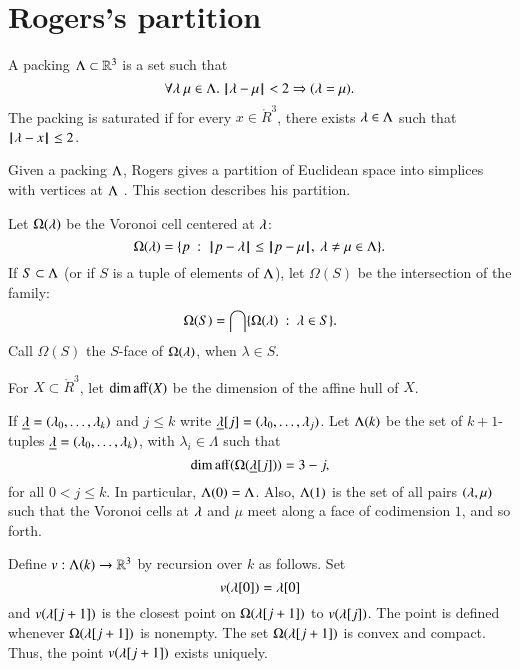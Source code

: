 \section{Rogers's partition}\label{sec:rogers}

\begin{definition}
A packing $\Lambda\subset \mathbb{R}^3$ is a set such that
$$\forall \lambda~\mu\in \Lambda.~  {\hskip0.1em|\hskip-0.15em|\hskip0.1em}\lambda - \mu{\hskip0.1em|\hskip-0.15em|\hskip0.1em} < 2 \Rightarrow (\lambda=\mu).$$
The packing is saturated if for every $x\in\ring{R}^3$,   there exists $\lambda\in\Lambda$
such that ${\hskip0.1em|\hskip-0.15em|\hskip0.1em}\lambda - x{\hskip0.1em|\hskip-0.15em|\hskip0.1em}\le 2$.
\end{definition}


Given a packing $\Lambda$, Rogers gives a partition of Euclidean space into
simplices with vertices at $\Lambda$ \cite{Rogers:1958:Packing}.   This section describes his partition.

Let $\Omega(\lambda)$  be the Voronoi cell centered at $\lambda$:
$$
  \Omega(\lambda) = \{p \ :\   {\hskip0.1em|\hskip-0.15em|\hskip0.1em}p - \lambda{\hskip0.1em|\hskip-0.15em|\hskip0.1em} 
\le {\hskip0.1em|\hskip-0.15em|\hskip0.1em}p - \mu{\hskip0.1em|\hskip-0.15em|\hskip0.1em},\ \lambda\ne\mu\in\Lambda\}.
$$
If $S\subset\Lambda$ (or if $S$ is a tuple of elements of $\Lambda$), 
let $\Omega(S)$ be the intersection of the family:
$$\Omega(S)  = \bigcap \{\Omega(\lambda)\ :\  \lambda\in S \}.$$
Call $\Omega(S)$ the $S$-face of $\Omega(\lambda)$, when $\lambda\in S$.

For $X\subset\ring{R}^3$,  let $\operatorname{dim\,aff}(X)$ be the dimension of the affine hull
of $X$.

If ${\underline{\lambda}}=(\lambda_0,\ldots,\lambda_k)$ and $j\le k$ write ${\underline{\lambda}}[j] = (\lambda_0,\ldots,\lambda_j)$.
Let $\Lambda(k)$ be the set of $k+1$-tuples ${\underline{\lambda}}=(\lambda_0,\ldots,\lambda_k)$, with
$\lambda_i\in\Lambda$ such
that 
\begin{equation}\label{eqn:omega-dim}
\operatorname{dim\,aff}(\Omega({\underline{\lambda}}[j])) = 3-j,
\end{equation}
for all $0<j\le k$.
In particular, $\Lambda(0)=\Lambda$.  Also, $\Lambda(1)$ is the
set of all pairs $(\lambda,\mu)$ such that the Voronoi cells at $\lambda$ and $\mu$ meet along
a face of codimension $1$, and
so forth.


Define $v:\Lambda(k)\to \mathbb{R}^3$ by recursion over $k$ as follows.
Set $$v(\lambda[0]) = \lambda[0]$$
and $v(\lambda[j+1])$ is the closest point on $\Omega(\lambda[j+1])$ to $v(\lambda[j])$.  The point is defined whenever $\Omega(\lambda[j+1])$ is nonempty.
The set $\Omega(\lambda[j+1])$ is convex and compact.  Thus, the point $v(\lambda[j+1])$ exists
uniquely.


